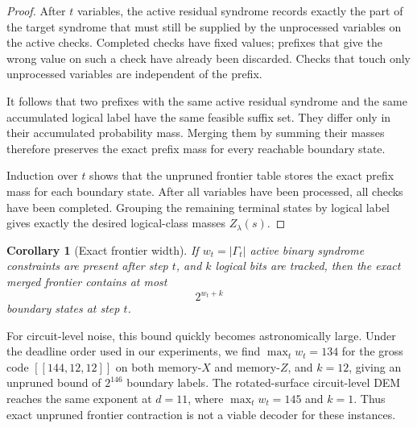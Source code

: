 \documentclass[a4paper,twocolumn,11pt,unpublished]{quantumarticle}
\newtheorem{corollary}{Corollary}
\begin{document}
\begin{proof}
After \(t\) variables, the active residual syndrome records exactly the part of
the target syndrome that must still be supplied by the unprocessed variables on
the active checks. Completed checks have fixed values; prefixes that give the
wrong value on such a check have already been discarded. Checks that touch only
unprocessed variables are independent of the prefix.

It follows that two prefixes with the same active residual syndrome and the
same accumulated logical label have the same feasible suffix set. They differ
only in their accumulated probability mass. Merging them by summing their
masses therefore preserves the exact prefix mass for every reachable boundary
state.

Induction over \(t\) shows that the unpruned frontier table stores the exact
prefix mass for each boundary state. After all variables have been processed,
all checks have been completed. Grouping the remaining terminal states by
logical label gives exactly the desired logical-class masses \(Z_\lambda(s)\).
\end{proof}

\begin{corollary}[Exact frontier width]
If \(w_t=|\Gamma_t|\) active binary syndrome constraints are present after step
\(t\), and \(k\) logical bits are tracked, then the exact merged frontier
contains at most
\begin{equation}
    2^{w_t+k}
\end{equation}
boundary states at step \(t\).
\end{corollary}

For circuit-level noise, this bound quickly becomes astronomically large.  Under the deadline order used in our experiments, we find \(\max_t w_t=134\) for the gross code $[[144,12,12]]$ on both memory-\(X\) and memory-\(Z\), and \(k=12\), giving an unpruned bound of \(2^{146}\) boundary labels.  The rotated-surface circuit-level DEM reaches the same exponent at \(d=11\), where \(\max_t w_t=145\) and \(k=1\).  Thus exact unpruned frontier contraction is not a viable decoder for these instances.
\end{document}
